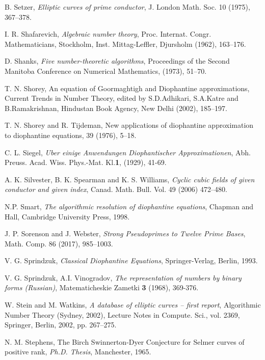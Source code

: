 \begin{thebibliography}{}
B. Setzer,
\emph{Elliptic curves of prime conductor},
J. London Math. Soc. 10 (1975), 367--378.

I. R. Shafarevich,
\emph{Algebraic number theory}, Proc. Internat. Congr. Mathematicians,
Stockholm, Inst. Mittag-Leffler, Djursholm (1962), 163--176.

D. Shanks,
\emph{Five number-theoretic algorithms},
 Proceedings of the Second Manitoba Conference on Numerical Mathematics, (1973), 51--70.

T. N. Shorey,
\newblock An equation of Goormaghtigh and Diophantine approximations,
\newblock Current Trends in Number Theory, edited by S.D.Adhikari, S.A.Katre and B.Ramakrishnan, Hindustan Book Agency, New Delhi (2002), 185--197.

T. N. Shorey and R. Tijdeman,
\newblock New applications of diophantine approximation to diophantine equations,
 39 (1976), 5--18.

C. L. Siegel,
\emph{\:Uber einige Anwendungen Diophantischer Approximationen},
Abh. Preuss. Acad. Wiss. Phys.-Mat. Kl.\textbf{1}, (1929), 41-69.

A. K. Silvester, B. K. Spearman and K. S. Williams,
\emph{Cyclic cubic fields of given conductor
and given index}, Canad. Math. Bull. Vol. 49 (2006)  472--480.

N.P. Smart, 
\emph{The algorithmic resolution of diophantine equations}, 
Chapman and Hall, Cambridge University Press, 1998.

 J. P. Sorenson and J. Webster, 
  \emph{Strong Pseudoprimes to Twelve 
Prime Bases}, Math. Comp. 86 (2017), 985--1003.

V. G. Sprindzuk,
\emph{Classical Diophantine Equations},
Springer-Verlag, Berlin, 1993.

V. G. Sprindzuk,  A.I. Vinogradov,
\emph{The representation of numbers by binary forms (Russian)},
Matematicheskie Zametki \textbf{3} (1968), 369-376.

W. Stein and M. Watkins,
\emph{A database of elliptic curves -- first report},
Algorithmic Number Theory (Sydney, 2002), Lecture Notes in Compute. Sci., vol. 2369, 
Springer, Berlin, 2002, pp. 267--275.
  
N. M. Stephens, 
The Birch Swinnerton-Dyer Conjecture for Selmer
curves of positive rank,
\emph{Ph.D. Thesis}, Manchester, 1965.


\end{thebibliography}
